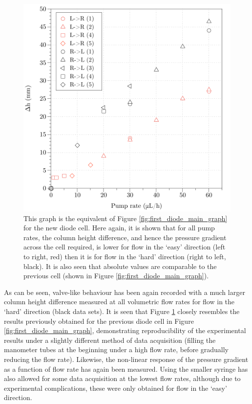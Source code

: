 \begin{figure}
\begin{center}
\includegraphics{Figures/Diode/second_diode/diff}
\end{center}
\caption[Difference in column heights as a function of flow rate for both directions (second diode behaviour)]{\label{fig:second_diode_diff} This graph is the equivalent of Figure \ref{fig:first_diode_main_graph} for the new diode cell. Here again, it is shown that for all pump rates, the column height difference, and hence the pressure gradient across the cell required, is lower for flow in the `easy' direction (left to right, red) then it is for flow in the `hard' direction (right to left, black). It is also seen that absolute values are comparable to the previous cell (shown in Figure \ref{fig:first_diode_main_graph}).}
\end{figure}

As can be seen, valve-like behaviour has been again recorded with a much larger column height difference measured at all volumetric flow rates for flow in the `hard' direction (black data sets). It is seen that Figure \ref{fig:second_diode_diff} closely resembles the results previously obtained for the previous diode cell in Figure \ref{fig:first_diode_main_graph}, demonstrating reproducibility of the experimental results under a slightly different method of data acquisition (filling the manometer tubes at the beginning under a high flow rate, before gradually reducing the flow rate). Likewise, the non-linear response of the pressure gradient as a function of flow rate has again been measured. Using the smaller syringe has also allowed for some data acquisition at the lowest flow rates, although due to experimental complications, these were only obtained for flow in the `easy' direction. 

